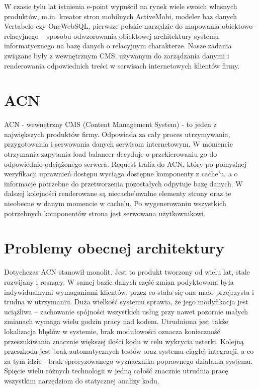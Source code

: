 \documentclass[licencjacka]{pracamgr}
\begin{document}
W czasie tylu lat istnienia e-point wypuścił na rynek wiele swoich własnych produktów, m.in. kreator stron mobilnych ActiveMobi, modeler baz danych Vertabelo czy OneWebSQL, pierwsze polskie narzędzie do mapowania obiektowo-relacyjnego – sposobu odwzorowania obiektowej architektury systemu informatycznego na bazę danych o relacyjnym charakterze. Nasze zadania związane były z wewnętrznym CMS, używanym do zarządzania danymi i renderowania odpowiednich treści w serwisach internetowych klientów firmy.

\section{ACN}

ACN - wewnętrzny CMS (Content Management System) - to jeden z największych produktów firmy. Odpowiada za cały proces utrzymywania, przygotowania i serwowania danych serwisom internetowym. W momencie otrzymania zapytania load balancer decyduje o przekierowaniu go do odpowiednio odciążonego serwera. Request trafia do ACN, który po pomyślnej weryfikacji uprawnień dostępu wyciąga dostępne komponenty z cache’u, a o informacje potrzebne do przetworzenia pozostałych odpytuje bazę danych. W dalszej kolejności renderowane są niecache’owalne elementy strony oraz te nieobecne w danym momencie w cache’u. Po wygenerowaniu wszystkich potrzebnych komponentów strona jest serwowana użytkownikowi.

\section{Problemy obecnej architektury}
Dotychczas ACN stanowił monolit. Jest to produkt tworzony od wielu lat, stale rozwijany i rosnący. W samej bazie danych część zmian podyktowana była indywidualnymi wymaganiami klientów, przez co stała się ona mało przejrzysta i trudna w utrzymaniu. Duża wielkość systemu sprawia, że jego modyfikacja jest uciążliwa – zachowanie spójności wszystkich usług przy nawet pozornie małych zmianach wymaga wielu godzin pracy nad kodem. Utrudniona jest także lokalizacja błędów w systemie, brak modułowości oznacza konieczność przeszukiwania znacznie większej ilości kodu w celu wykrycia usterki. Kolejną przeszkodą jest brak automatycznych testów oraz systemu ciągłej integracji, a co za tym idzie - brak sprecyzowanego wyznacznika poprawnego działania systemu. Spięcie wielu różnych technologii w jedną całość znacznie utrudnia pracę wszystkim narzędziom do statycznej analizy kodu.
\end{document}
